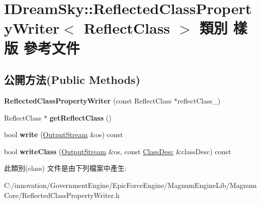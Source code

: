 \hypertarget{class_i_dream_sky_1_1_reflected_class_property_writer}{}\section{I\+Dream\+Sky\+:\+:Reflected\+Class\+Property\+Writer$<$ Reflect\+Class $>$ 類別 樣版 參考文件}
\label{class_i_dream_sky_1_1_reflected_class_property_writer}
\subsection*{公開方法(Public Methods)}
\begin{DoxyCompactItemize}
\item 
{\bfseries Reflected\+Class\+Property\+Writer} (const Reflect\+Class $\ast$reflect\+Class\+\_\+)\hypertarget{class_i_dream_sky_1_1_reflected_class_property_writer_acc622e04c2b97b5ebdd35538bc43d096}{}\label{class_i_dream_sky_1_1_reflected_class_property_writer_acc622e04c2b97b5ebdd35538bc43d096}

\item 
Reflect\+Class $\ast$ {\bfseries get\+Reflect\+Class} ()\hypertarget{class_i_dream_sky_1_1_reflected_class_property_writer_ac29d953aa0342fec9bce033f24ca7168}{}\label{class_i_dream_sky_1_1_reflected_class_property_writer_ac29d953aa0342fec9bce033f24ca7168}

\item 
bool {\bfseries write} (\hyperlink{class_i_dream_sky_1_1_output_stream}{Output\+Stream} \&os) const \hypertarget{class_i_dream_sky_1_1_reflected_class_property_writer_ab19eb3341b9d5aac2757a2d20170f3b6}{}\label{class_i_dream_sky_1_1_reflected_class_property_writer_ab19eb3341b9d5aac2757a2d20170f3b6}

\item 
bool {\bfseries write\+Class} (\hyperlink{class_i_dream_sky_1_1_output_stream}{Output\+Stream} \&os, const \hyperlink{classagm_1_1reflection_1_1_class_desc}{Class\+Desc} \&class\+Desc) const \hypertarget{class_i_dream_sky_1_1_reflected_class_property_writer_a1b61a65dc31e75f1f2d26f25287f5474}{}\label{class_i_dream_sky_1_1_reflected_class_property_writer_a1b61a65dc31e75f1f2d26f25287f5474}

\end{DoxyCompactItemize}


此類別(class) 文件是由下列檔案中產生\+:\begin{DoxyCompactItemize}
\item 
C\+:/innovation/\+Government\+Engine/\+Epic\+Force\+Engine/\+Magnum\+Engine\+Lib/\+Magnum\+Core/Reflected\+Class\+Property\+Writer.\+h\end{DoxyCompactItemize}

